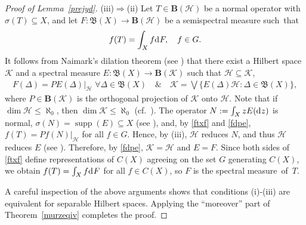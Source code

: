 \documentclass[reqno]{amsproc}
\DeclareMathOperator{\supp}{supp}
\numberwithin{equation}{section}
\theoremstyle{remark}
\newcommand*{\hh}{\mathcal{H}}
\newcommand*{\kk}{\mathcal{K}}
\newcommand*{\borel}{\mathfrak{B}}
\newcommand*{\D}{\mathrm{d\hspace{.1ex}}}
\theoremstyle{definition}
\newcommand*{\Le}{\leqslant}
\newcommand*{\ogr}{\boldsymbol{B}}
\begin{document}
\begin{proof}[Proof of Lemma~\ref{prejyd}]
(iii)$\Rightarrow$(ii) Let $T\in \ogr(\hh)$ be a
normal operator with $\sigma(T)\subseteq X$, and let
$F\colon \borel(X) \to \ogr(\hh)$ be a semispectral
measure such~that
   \begin{align} \label{ftxf}
f(T)=\int_{X} f \D F, \quad f\in G.
   \end{align}
It follows from Naimark's dilation theorem (see
\cite[Theorem~6.4]{Ml78}) that there exist a Hilbert
space $\kk$ and a spectral measure $E\colon
\borel(X)\to \ogr(\kk)$ such that $\hh\subseteq \kk$,
   \begin{align} \label{fdpe}
F(\varDelta) = PE(\varDelta)|_{\hh} \; \forall
\varDelta \in \borel(X) \quad \& \quad \kk = \bigvee
\Big\{E(\varDelta)\hh\colon \varDelta \in
\borel(X)\Big\},
   \end{align}
where $P\in \ogr(\kk)$ is the orthogonal projection of
$\kk$ onto $\hh$. Note that if $\dim \hh \Le
\aleph_0$, then $\dim \kk \Le \aleph_0$ (cf.\
\cite[Proposition~1($\delta$)]{St-SzIII}). The
operator $N:=\int_{X} z E(\D z) $ is normal,
$\sigma(N) = \supp(E) \subseteq X$ (see
\cite[Theorem~6.6.2]{Bir-Sol87}), and, by \eqref{ftxf}
and \eqref{fdpe}, $f(T) = Pf(N)|_{\hh}$ for all $f\in
G$. Hence, by (iii), $\hh$ reduces $N$, and thus $\hh$
reduces $E$ (see \cite[Theorem~6.6.3]{Bir-Sol87}).
Therefore, by \eqref{fdpe}, $\kk=\hh$ and $E=F$. Since
both sides of \eqref{ftxf} define representations of
$C(X)$ agreeing on the set $G$ generating $C(X)$, we
obtain $f(T)=\int_{X} f \D F$ for all $f\in C(X)$, so
$F$ is the spectral measure~of~$T$.

A careful inspection of the above arguments shows that
conditions (i)-(iii) are equivalent for separable
Hilbert spaces. Applying the ``moreover'' part of
Theorem~\ref{murzeqiv} completes the proof.
   \end{proof}
\end{document}
